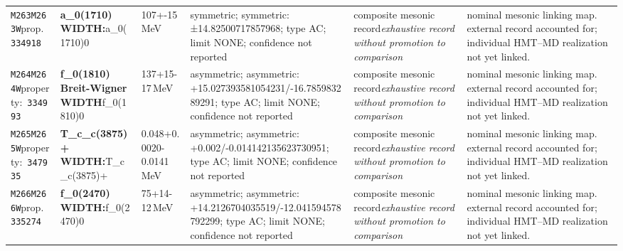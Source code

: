 \begin{landscape}
\begin{longtable}{L{1.85cm}L{4.45cm}L{2.35cm}L{4.05cm}L{3.35cm}L{7.15cm}}
\texttt{M263}\newline \texttt{M263W}\newline prop.\ \texttt{334918} & \textbf{a\_\allowbreak{}0(1710) WIDTH:}\newline a\_\allowbreak{}0(1710)0 & 107+-15\,MeV & symmetric; symmetric: ±14.82500717857968; type AC; limit NONE; confidence not reported & composite mesonic record\newline \emph{exhaustive record without promotion to comparison} & nominal mesonic linking map. external record accounted for; individual HMT--MD realization not yet linked. \\
\texttt{M264}\newline \texttt{M264W}\newline property:\ \texttt{334993} & \textbf{f\_\allowbreak{}0(1810) Breit-Wigner WIDTH}\newline f\_\allowbreak{}0(1810)0 & 137+15-17\,MeV & asymmetric; asymmetric: +15.027393581054231/-16.785983289291; type AC; limit NONE; confidence not reported & composite mesonic record\newline \emph{exhaustive record without promotion to comparison} & nominal mesonic linking map. external record accounted for; individual HMT--MD realization not yet linked. \\
\texttt{M265}\newline \texttt{M265W}\newline property:\ \texttt{347935} & \textbf{T\_\allowbreak{}c\_\allowbreak{}c(3875)+ WIDTH:}\newline T\_\allowbreak{}c\_\allowbreak{}c(3875)+ & 0.048+0.0020-0.0141\,MeV & asymmetric; asymmetric: +0.002/-0.014142135623730951; type AC; limit NONE; confidence not reported & composite mesonic record\newline \emph{exhaustive record without promotion to comparison} & nominal mesonic linking map. external record accounted for; individual HMT--MD realization not yet linked. \\
\texttt{M266}\newline \texttt{M266W}\newline prop.\ \texttt{335274} & \textbf{f\_\allowbreak{}0(2470) WIDTH:}\newline f\_\allowbreak{}0(2470)0 & 75+14-12\,MeV & asymmetric; asymmetric: +14.2126704035519/-12.041594578792299; type AC; limit NONE; confidence not reported & composite mesonic record\newline \emph{exhaustive record without promotion to comparison} & nominal mesonic linking map. external record accounted for; individual HMT--MD realization not yet linked. \\

\end{longtable}
\end{landscape}
